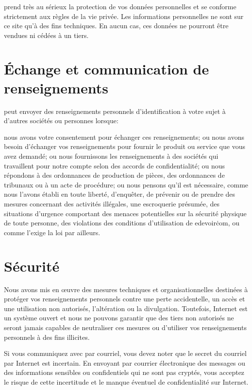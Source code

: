 \eDevoir prend très au sérieux la protection de vos données personnelles et se conforme strictement aux règles de la vie privée. Les informations personnelles ne sont sur ce site qu'à des fins techniques. En aucun cas, ces données ne pourront être vendues ni cédées à un tiers.

\section{Échange et communication de renseignements}

\eDevoir peut envoyer des renseignements personnels d'identification à votre sujet à d'autres sociétés ou personnes lorsque:
\begin{itemize}
	\li nous avons votre consentement pour échanger ces renseignements; ou
	\li nous avons besoin d'échanger vos renseignements pour fournir le produit ou service que vous avez demandé; ou
	\li nous fournissons les renseignements à des sociétés qui travaillent pour notre compte selon des accords de confidentialité; ou
	\li nous répondons à des ordonnances de production de pièces, des ordonnances de tribunaux ou à un acte de procédure; ou
	\li nous pensons qu'il est nécessaire, comme nous l'avons établi en toute liberté, d'enquêter, de prévenir ou de prendre des mesures concernant des activités illégales, une escroquerie présumée, des situations d'urgence comportant des menaces potentielles sur la sécurité physique de toute personne, des violations des conditions d'utilisation de edevoir\.com, ou comme l'exige la loi par ailleurs.
\end{itemize}

\section{Sécurité}

Nous avons mis en œuvre des mesures techniques et organisationnelles destinées à protéger vos renseignements personnels contre une perte accidentelle, un accès et une utilisation non autorisés, l'altération ou la divulgation. Toutefois, Internet est un système ouvert et nous ne pouvons garantir que des tiers non autorisés ne seront jamais capables de neutraliser ces mesures ou d'utiliser vos renseignements personnels à des fins illicites.

Si vous communiquez avec \eDevoir par courriel, vous devez noter que le secret du courriel par Internet est incertain. En envoyant par courrier électronique des messages ou des informations sensibles ou confidentiels qui ne sont pas cryptés, vous acceptez le risque de cette incertitude et le manque éventuel de confidentialité sur Internet.

